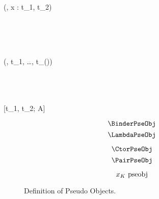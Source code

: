 
\Rule{\BinderPseObj}
    {
         \\
         \\
    }
    {(\kappa, x : t_1, t_2) \pseobj}
    {}

\Rule{\LambdaPseObj}
    {
         \\
         \\
    }
    { \pseobj}
    {}

\Rule{\CtorPseObj}
    {
         \\
    }
    {(\kappa, t_1, \ldots, t_{(\kappa)}) \pseobj}
    {}

\Rule{\PairPseObj}
    {
         \\
         \\
         \\
    }
    {[t_1, t_2; A] \pseobj}
    {}

\begin{figure}
    \centering
    \begin{minipage}{0.5\textwidth}
        $$\BinderPseObj$$
        $$\LambdaPseObj$$
    \end{minipage}%
    \begin{minipage}{0.5\textwidth}
        $$\CtorPseObj$$
        $$\PairPseObj$$
    \end{minipage}%
    $$x_K ~\textnormal{pseobj}$$
    \caption{Definition of Pseudo Objects.}
    \label{fig:2:pseobj}
\end{figure}
